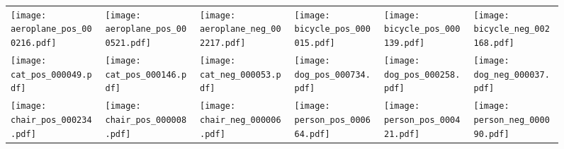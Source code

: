 \documentclass[10pt,twocolumn,letterpaper]{article}
\begin{document}
\begin{figure*}[t!]
\begin{tabular}{*{6}{C{0.13\textwidth}}}
  \texttt{[image: aeroplane\_pos\_000216.pdf]}&
  \texttt{[image: aeroplane\_pos\_000521.pdf]}&
  \texttt{[image: aeroplane\_neg\_002217.pdf]}&
  \texttt{[image: bicycle\_pos\_000015.pdf]}&
  \texttt{[image: bicycle\_pos\_000139.pdf]}&
  \texttt{[image: bicycle\_neg\_002168.pdf]}\\[-2ex]

  \texttt{[image: cat\_pos\_000049.pdf]}&
  \texttt{[image: cat\_pos\_000146.pdf]}&
  \texttt{[image: cat\_neg\_000053.pdf]}&
  \texttt{[image: dog\_pos\_000734.pdf]}&
  \texttt{[image: dog\_pos\_000258.pdf]}&
  \texttt{[image: dog\_neg\_000037.pdf]}\\[-2ex]
  
  \texttt{[image: chair\_pos\_000234.pdf]}&
  \texttt{[image: chair\_pos\_000008.pdf]}&
  \texttt{[image: chair\_neg\_000006.pdf]}&
  \texttt{[image: person\_pos\_000664.pdf]}&
  \texttt{[image: person\_pos\_000421.pdf]}&
  \texttt{[image: person\_neg\_000090.pdf]}\\[-2ex]
  

\end{tabular}
\end{figure*}
\end{document}
